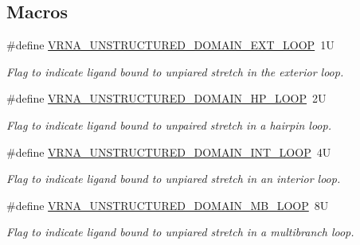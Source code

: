 \subsection*{Macros}
\begin{DoxyCompactItemize}
\item 
\mbox{\label{group__domains__up_gaac911374e86236a51bfd42e1f098eaba}} 
\#define \mbox{\hyperlink{group__domains__up_gaac911374e86236a51bfd42e1f098eaba}{V\+R\+N\+A\+\_\+\+U\+N\+S\+T\+R\+U\+C\+T\+U\+R\+E\+D\+\_\+\+D\+O\+M\+A\+I\+N\+\_\+\+E\+X\+T\+\_\+\+L\+O\+OP}}~1U
\begin{DoxyCompactList}\small\item\em Flag to indicate ligand bound to unpiared stretch in the exterior loop. \end{DoxyCompactList}\item 
\mbox{\label{group__domains__up_ga23b610ea9564346c45cc1e2bbb62adf7}} 
\#define \mbox{\hyperlink{group__domains__up_ga23b610ea9564346c45cc1e2bbb62adf7}{V\+R\+N\+A\+\_\+\+U\+N\+S\+T\+R\+U\+C\+T\+U\+R\+E\+D\+\_\+\+D\+O\+M\+A\+I\+N\+\_\+\+H\+P\+\_\+\+L\+O\+OP}}~2U
\begin{DoxyCompactList}\small\item\em Flag to indicate ligand bound to unpaired stretch in a hairpin loop. \end{DoxyCompactList}\item 
\mbox{\label{group__domains__up_gac4a0feccd9654c149203200248c2716b}} 
\#define \mbox{\hyperlink{group__domains__up_gac4a0feccd9654c149203200248c2716b}{V\+R\+N\+A\+\_\+\+U\+N\+S\+T\+R\+U\+C\+T\+U\+R\+E\+D\+\_\+\+D\+O\+M\+A\+I\+N\+\_\+\+I\+N\+T\+\_\+\+L\+O\+OP}}~4U
\begin{DoxyCompactList}\small\item\em Flag to indicate ligand bound to unpiared stretch in an interior loop. \end{DoxyCompactList}\item 
\mbox{\label{group__domains__up_ga67b80796655e5227a4ed662bfbe398b0}} 
\#define \mbox{\hyperlink{group__domains__up_ga67b80796655e5227a4ed662bfbe398b0}{V\+R\+N\+A\+\_\+\+U\+N\+S\+T\+R\+U\+C\+T\+U\+R\+E\+D\+\_\+\+D\+O\+M\+A\+I\+N\+\_\+\+M\+B\+\_\+\+L\+O\+OP}}~8U
\begin{DoxyCompactList}\small\item\em Flag to indicate ligand bound to unpiared stretch in a multibranch loop. \end{DoxyCompactList}\item 

\end{DoxyCompactItemize}
